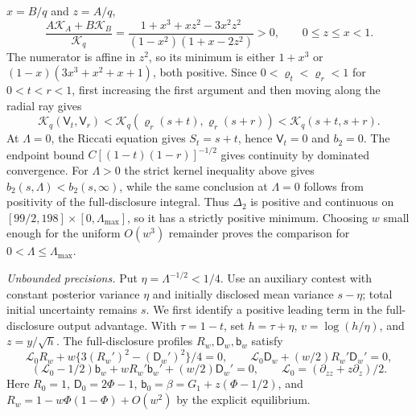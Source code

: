 \documentclass[mnsc]{informs3}
\begin{document}
\begin{APPENDICES}
{$x=B/q$ and $z=A/q$,
\[
\frac{A\mathscr K_A+B\mathscr K_B}{\mathscr K_q}
=\frac{1+x^3+xz^2-3x^2z^2}
{(1-x^2)(1+x-2z^2)}>0,\qquad 0\leq z\leq x<1.
\]
The numerator is affine in $z^2$, so its minimum is either
$1+x^3$ or $(1-x)(3x^3+x^2+x+1)$, both positive.
Since $0<\varrho_t<\varrho_r<1$ for $0<t<r<1$, first increasing the
first argument and then moving along the radial ray gives
\[
\mathscr K_q(\mathsf V_t,\mathsf V_r)
<\mathscr K_q\!\left(\varrho_r(s+t),\varrho_r(s+r)\right)
<\mathscr K_q(s+t,s+r).
\]
At $\Lambda=0$, the Riccati equation gives $S_t=s+t$, hence $\mathsf V_t=0$ and
$b_2=0$. The endpoint bound
$C[(1-t)(1-r)]^{-1/2}$ gives continuity by dominated convergence.
For $\Lambda>0$ the strict kernel inequality above gives
$b_2(s,\Lambda)<b_2(s,\infty)$, while the same conclusion at $\Lambda=0$
follows from positivity of the full-disclosure integral. Thus
$\Delta_2$ is positive and continuous on
$[99/2,198]\times[0,{\Lambda_{\max}}]$, so it has a strictly positive minimum. Choosing
$w$ small enough for the uniform $O(w^3)$ remainder proves the comparison
for $0<\Lambda\leq {\Lambda_{\max}}$.

\emph{Unbounded precisions.}
Put $\eta=\Lambda^{-1/2}<1/4$.
Use an auxiliary contest with constant posterior variance $\eta$
and initially disclosed mean variance $s-\eta$; total initial
uncertainty remains $s$. We first identify a positive leading term
in the full-disclosure output advantage. With $\tau=1-t$, set
$h=\tau+\eta$, $v=\log(h/\eta)$, and $z=y/\sqrt h$.
The full-disclosure profiles $R_w,\mathsf D_w,\mathsf b_w$ satisfy
\[
\mathscr L_0R_w+w\{3(R_w')^2-(\mathsf D_w')^2\}/4=0,\qquad
\mathscr L_0\mathsf D_w+(w/2)R_w'\mathsf D_w'=0,
\]
\[
(\mathscr L_0-1/2)\mathsf b_w+wR_w'\mathsf b_w'+(w/2)\mathsf D_w'=0,
\qquad \mathscr L_0=(\partial_{zz}+z\partial_z)/2.
\]
Here $R_0=1$, $\mathsf D_0=2\Phi-1$, $\mathsf b_0=\beta=G_1+z(\Phi-1/2)$,
and $R_w=1-w\Phi(1-\Phi)+O(w^2)$ by the explicit equilibrium.

}
\end{APPENDICES}
\end{document}

